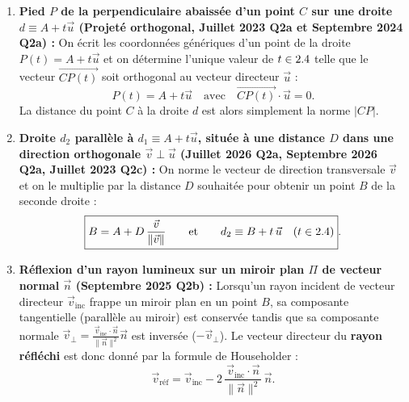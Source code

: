 \begin{theoreme}
\begin{enumerate}
    \item \textbf{Pied $P$ de la perpendiculaire abaissée d'un point $C$ sur une droite $d \equiv A + t\vec{u}$ (Projeté orthogonal, Juillet 2023 Q2a et Septembre 2024 Q2a) :}
    On écrit les coordonnées génériques d'un point de la droite $P(t) = A + t\vec{u}$ et on détermine l'unique valeur de $t \in 2.4$ telle que le vecteur $\overrightarrow{CP(t)}$ soit orthogonal au vecteur directeur $\vec{u}$ :
    \[
        \boxed{P(t) = A + t\vec{u} \quad \text{avec} \quad \overrightarrow{CP(t)} \cdot \vec{u} = 0}.
    \]
    La distance du point $C$ à la droite $d$ est alors simplement la norme $|CP|$.
    \item \textbf{Droite $d_2$ parallèle à $d_1 \equiv A + t\vec{u}$, située à une distance $D$ dans une direction orthogonale $\vec{v} \perp \vec{u}$ (Juillet 2026 Q2a, Septembre 2026 Q2a, Juillet 2023 Q2c) :}
    On norme le vecteur de direction transversale $\vec{v}$ et on le multiplie par la distance $D$ souhaitée pour obtenir un point $B$ de la seconde droite :
    \[
        \boxed{B = A + D\,\frac{\vec{v}}{\|\vec{v}\|} \qquad \text{et} \qquad d_2 \equiv B + t\,\vec{u} \quad (t \in 2.4)}.
    \]
    \item \textbf{Réflexion d'un rayon lumineux sur un miroir plan $\Pi$ de vecteur normal $\vec{n}$ (Septembre 2025 Q2b) :}
    Lorsqu'un rayon incident de vecteur directeur $\vec{v}_{\text{inc}}$ frappe un miroir plan en un point $B$, sa composante tangentielle (parallèle au miroir) est conservée tandis que sa composante normale $\vec{v}_{\perp} = \frac{\vec{v}_{\text{inc}}\cdot\vec{n}}{\|\vec{n}\|^2}\vec{n}$ est inversée ($-\vec{v}_\perp$). Le vecteur directeur du \textbf{rayon réfléchi} est donc donné par la formule de Householder :
    \[
        \boxed{\vec{v}_{\text{réf}} = \vec{v}_{\text{inc}} - 2\,\frac{\vec{v}_{\text{inc}} \cdot \vec{n}}{\|\vec{n}\|^2}\,\vec{n}}.
    \]
\end{enumerate}
\end{theoreme}

